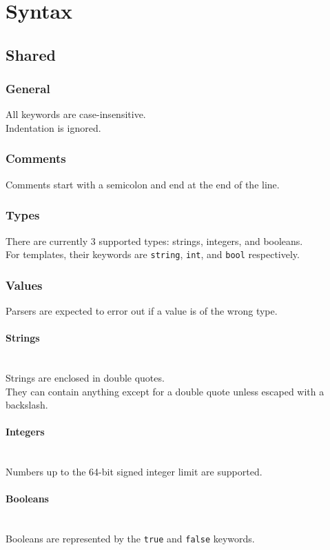 \documentclass[12pt]{article}
\let\oldparagraph\paragraph
\renewcommand{\paragraph}[1]{\oldparagraph{#1}\mbox{}\\}
\begin{document}
    \newpage

    \section{Syntax}
    \subsection{Shared}

    \subsubsection{General}
    All keywords are case-insensitive. \\
    Indentation is ignored.

    \subsubsection{Comments}
    Comments start with a semicolon and end at the end of the line.

    \subsubsection{Types}
    There are currently 3 supported types: strings, integers, and booleans. \\
    For templates, their keywords are \texttt{string}, \texttt{int}, and \texttt{bool} respectively.

    \subsubsection{Values}
    Parsers are expected to error out if a value is of the wrong type.
   
    \paragraph{Strings}
    Strings are enclosed in double quotes. \\
    They can contain anything except for a double quote unless escaped with a backslash.

    \paragraph{Integers}
    Numbers up to the 64-bit signed integer limit are supported.

    \paragraph{Booleans}
    Booleans are represented by the \texttt{true} and \texttt{false} keywords.
\end{document}
